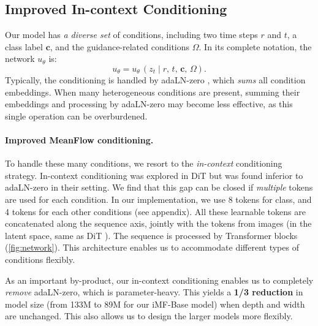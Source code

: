 \subsection{Improved In-context Conditioning}
\label{sec:method-arch}

Our model has \textit{a diverse set} of conditions, including two time steps $r$ and $t$, a class label $\mathbf{c}$, and the guidance-related conditions $\Omega$. In its complete notation, the network $u_\theta$ is:
\begin{equation}
\label{eq:cond-args}
u_\theta =u_\theta\,\left(z_t \mid r,\,t,\,\mathbf{c},\,\Omega \right).
\end{equation}
Typically, the conditioning is handled by adaLN-zero \cite{dit}, which \textit{sums} all condition embeddings. When many heterogeneous conditions are present, summing their embeddings and processing by adaLN-zero may become less effective, as this single operation can be overburdened.

\paragraph{Improved MeanFlow conditioning.}
To handle these many conditions, we resort to the \textit{in-context} conditioning strategy. In-context conditioning was explored in DiT \cite{dit} but was found inferior to adaLN-zero in their setting. We find that this gap can be closed if \textit{multiple} tokens are used for each condition. In our implementation, we use 8 tokens for class, and 4 tokens for each other conditions (see appendix). 
All these learnable tokens are concatenated along the sequence axis, jointly with the tokens from images (in the latent space, same as DiT \cite{dit}). The sequence is processed by Transformer blocks (\cref{fig:network}). 
This architecture enables us to accommodate different types of conditions flexibly.


As an important by-product, our in-context conditioning enables us to completely \textit{remove} adaLN-zero, which is parameter-heavy. This yields a \textbf{1/3 reduction} in model size (\eg from 133M to 89M for our iMF-Base model) when depth and width are unchanged. This also allows us to design the larger models more flexibly.
